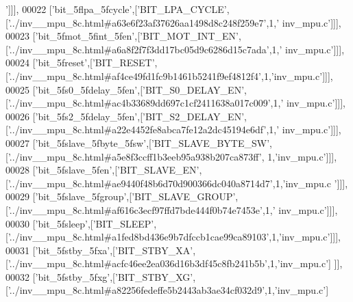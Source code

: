 \begin{DoxyCode}
{      '}]]],
00022   [\textcolor{stringliteral}{'bit\_5flpa\_5fcycle'},[\textcolor{stringliteral}{'BIT\_LPA\_CYCLE'},[\textcolor{stringliteral}{'../inv\_\_mpu\_8c.html#a63e6f23af37626aa1498d8c248f259e7'},1,\textcolor{stringliteral}{'
      inv\_mpu.c'}]]],
00023   [\textcolor{stringliteral}{'bit\_5fmot\_5fint\_5fen'},[\textcolor{stringliteral}{'BIT\_MOT\_INT\_EN'},[\textcolor{stringliteral}{'../inv\_\_mpu\_8c.html#a6a8f2f7f3dd17bc05d9c6286d15c7ada'},1,\textcolor{stringliteral}{'
      inv\_mpu.c'}]]],
00024   [\textcolor{stringliteral}{'bit\_5freset'},[\textcolor{stringliteral}{'BIT\_RESET'},[\textcolor{stringliteral}{'../inv\_\_mpu\_8c.html#af4ce49fd1fc9b1461b5241f9ef4812f4'},1,\textcolor{stringliteral}{'inv\_mpu.c'}]]],
00025   [\textcolor{stringliteral}{'bit\_5fs0\_5fdelay\_5fen'},[\textcolor{stringliteral}{'BIT\_S0\_DELAY\_EN'},[\textcolor{stringliteral}{'../inv\_\_mpu\_8c.html#ac4b33689dd697c1cf2411638a017c009'},1,\textcolor{stringliteral}{'
      inv\_mpu.c'}]]],
00026   [\textcolor{stringliteral}{'bit\_5fs2\_5fdelay\_5fen'},[\textcolor{stringliteral}{'BIT\_S2\_DELAY\_EN'},[\textcolor{stringliteral}{'../inv\_\_mpu\_8c.html#a22e4452fe8abca7fe12a2dc45194e6df'},1,\textcolor{stringliteral}{'
      inv\_mpu.c'}]]],
00027   [\textcolor{stringliteral}{'bit\_5fslave\_5fbyte\_5fsw'},[\textcolor{stringliteral}{'BIT\_SLAVE\_BYTE\_SW'},[\textcolor{stringliteral}{'../inv\_\_mpu\_8c.html#a5e8f3ccff1b3eeb95a938b207ca873ff'},
      1,\textcolor{stringliteral}{'inv\_mpu.c'}]]],
00028   [\textcolor{stringliteral}{'bit\_5fslave\_5fen'},[\textcolor{stringliteral}{'BIT\_SLAVE\_EN'},[\textcolor{stringliteral}{'../inv\_\_mpu\_8c.html#ae9440f48b6d70d900366dc040a8714d7'},1,\textcolor{stringliteral}{'inv\_mpu.c
      '}]]],
00029   [\textcolor{stringliteral}{'bit\_5fslave\_5fgroup'},[\textcolor{stringliteral}{'BIT\_SLAVE\_GROUP'},[\textcolor{stringliteral}{'../inv\_\_mpu\_8c.html#af616c3ecf97ffd7bde444f0b74e7453e'},1,\textcolor{stringliteral}{'
      inv\_mpu.c'}]]],
00030   [\textcolor{stringliteral}{'bit\_5fsleep'},[\textcolor{stringliteral}{'BIT\_SLEEP'},[\textcolor{stringliteral}{'../inv\_\_mpu\_8c.html#a1fed8bd436e9b7dfccb1cae99ca89103'},1,\textcolor{stringliteral}{'inv\_mpu.c'}]]],
00031   [\textcolor{stringliteral}{'bit\_5fstby\_5fxa'},[\textcolor{stringliteral}{'BIT\_STBY\_XA'},[\textcolor{stringliteral}{'../inv\_\_mpu\_8c.html#acfc46ee2ea036d16b3df45c8fb241b5b'},1,\textcolor{stringliteral}{'inv\_mpu.c'}]
      ]],
00032   [\textcolor{stringliteral}{'bit\_5fstby\_5fxg'},[\textcolor{stringliteral}{'BIT\_STBY\_XG'},[\textcolor{stringliteral}{'../inv\_\_mpu\_8c.html#a82256fedeffe5b2443ab3ae34cf032d9'},1,\textcolor{stringliteral}{'inv\_mpu.c'}]

\end{DoxyCode}

